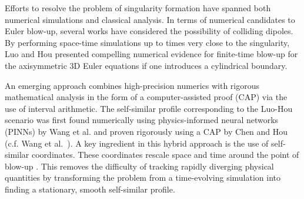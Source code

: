 \documentclass[fleqn,11pt]{wlscirep}
\begin{document}
Efforts to resolve the problem of singularity formation have spanned both numerical simulations and classical analysis. In terms of numerical candidates to Euler blow-up, several works have considered the possibility of colliding dipoles\cite{PumirSiggia,kerr,Hou2022}. By performing space-time simulations up to times very close to the singularity, Luo and Hou\cite{Luo-Hou:singularities-euler-3d} presented compelling numerical evidence for finite-time blow-up for the axisymmetric 3D Euler equations if one introduces a cylindrical boundary.

An emerging approach combines high-precision numerics with rigorous mathematical analysis in the form of a computer-assisted proof (CAP) via the use of interval arithmetic\cite{GomezSerrano:survey-cap-in-pde}. The self-similar profile corresponding to the Luo-Hou scenario was first found numerically using physics-informed neural networks (PINNs)\cite{Raissi-Perdikaris-Karniadakis:pinn-first-paper,Karniadakis-Kevrekidis-Lu-Perdikaris-Wang-Yang:pinn-nature-reviews} by Wang et al. \cite{Wang-Lai-GomezSerrano-Buckmaster:pinn-selfsimilar-boussinesq} and proven rigorously using a CAP by Chen and Hou\cite{Chen-Hou:stable-nearly-self-similar-blowup-boussinesq-part-i,Chen-Hou:stable-nearly-self-similar-blowup-boussinesq-part-ii} (c.f. Wang et al.\ \cite{2025arXiv250619243W}). A key ingredient in this hybrid approach\cite{Costin-Tanveer:analytical-approximation-blasius,Elgindi-Pasqualotto:invertibility-boussinesq-cap,Castro-Cordoba-GomezSerrano:global-smooth-solutions-sqg} is the use of self-similar coordinates. These coordinates rescale space and time around the point of blow-up \cite{Buckmaster-CaoLabora-GomezSerrano:implosion-compressible,Eggers-Fontelos:self-similarity,Elgindi:singularities-C1a-euler-R3}. This removes the difficulty of tracking rapidly diverging physical quantities by transforming the problem from a time-evolving simulation into finding a stationary, smooth self-similar profile.
\end{document}
